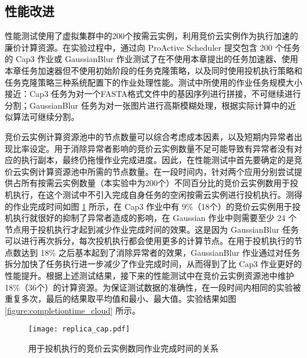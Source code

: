 \subsection{性能改进}
\label{sec:no2_perf}
性能测试使用了虚拟集群中的200个按需云实例，利用竞价云实例作为执行加速的廉价计算资源。在实验过程中，通过向 ProActive Scheduler 提交包含 200 个任务的 Cap3 作业或 GaussianBlur 作业测试了在不使用本章提出的任务加速器、使用本章任务加速器但不使用初始阶段的任务克隆策略，以及同时使用投机执行策略和任务克隆策略三种系统配置下的作业处理性能。测试中所使用的作业任务规模大小接近：Cap3 任务为对一个FASTA格式文件中的基因序列进行拼接，不可继续进行分割；GaussianBlur 任务为对一张图片进行高斯模糊处理，根据实际计算中的近似算法可继续分割。

竞价云实例计算资源池中的节点数量可以综合考虑成本因素，以及短期内异常者出现比率设定。用于消除异常者影响的竞价云实例数量不足可能导致有异常者没有对应的执行副本，最终仍拖慢作业完成进度。因此，在性能测试中首先要确定的是竞价云实例计算资源池中所需的节点数量。在一段时间内，针对两个应用分别尝试提供占所有按需云实例数量（本实验中为200个）不同百分比的竞价云实例数用于投机执行，在这个测试中不引入完成自身任务的空闲按需云实例进行投机执行。测得的作业完成时间如图 \ref{figure:replica_cap} 所示，在 Cap3 作业中有 9\%（18个）的竞价云实例用于投机执行就很好的抑制了异常者造成的影响，在 Gaussian 作业中则需要至少 24 个节点用于投机执行才起到减少作业完成时间的效果。这是因为 GaussianBlur 任务可以进行再次拆分，每次投机执行都会使用更多的计算节点。在用于投机执行的节点数达到 18\% 之后基本起到了消除异常者的效果，GaussianBlur 作业通过对任务拆分加快了任务执行进一步减少了作业完成时间，从而得到了比 Cap3 作业更好的性能提升。根据上述测试结果，接下来的性能测试中在竞价云实例资源池中维护 18\%（36个）的计算资源。为保证测试数据的准确性，在一段时间内相同的实验被重复多次，最后的结果取平均值和最小、最大值。实验结果如图 \ref{figure:completiontime_cloud} 所示。
\begin{figure}
  \centering
  \texttt{[image: replica\_cap.pdf]}
  \caption{用于投机执行的竞价云实例数同作业完成时间的关系}
  \label{figure:replica_cap}
\end{figure}

